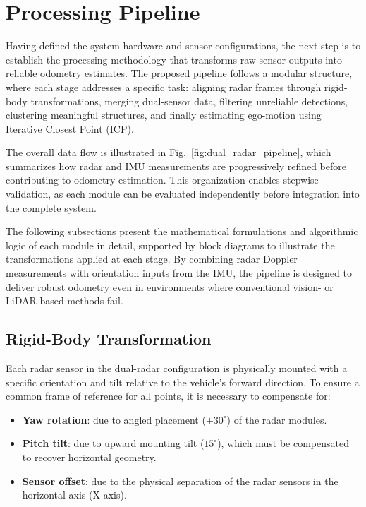 \section{Processing Pipeline}
\label{sec:processing_pipeline}

Having defined the system hardware and sensor configurations, the next step is to establish the processing methodology that transforms raw sensor outputs into reliable odometry estimates.  
The proposed pipeline follows a modular structure, where each stage addresses a specific task: aligning radar frames through rigid-body transformations, merging dual-sensor data, filtering unreliable detections, clustering meaningful structures, and finally estimating ego-motion using Iterative Closest Point (ICP).  

The overall data flow is illustrated in Fig.~\ref{fig:dual_radar_pipeline}, which summarizes how radar and IMU measurements are progressively refined before contributing to odometry estimation.  
This organization enables stepwise validation, as each module can be evaluated independently before integration into the complete system.  

The following subsections present the mathematical formulations and algorithmic logic of each module in detail, supported by block diagrams to illustrate the transformations applied at each stage.  
By combining radar Doppler measurements with orientation inputs from the IMU, the pipeline is designed to deliver robust odometry even in environments where conventional vision- or LiDAR-based methods fail.

\vspace{0.5em}
\subsection{Rigid-Body Transformation}  

Each radar sensor in the dual-radar configuration is physically mounted with a specific orientation and tilt relative to the vehicle's forward direction.
To ensure a common frame of reference for all points, it is necessary to compensate for:

\begin{itemize}
    \item \textbf{Yaw rotation}: due to angled placement ($\pm30^\circ$) of the radar modules.
    \item \textbf{Pitch tilt}: due to upward mounting tilt ($15^\circ$), which must be compensated to recover horizontal geometry.
    \item \textbf{Sensor offset}: due to the physical separation of the radar sensors in the horizontal axis (X-axis).
\end{itemize}


